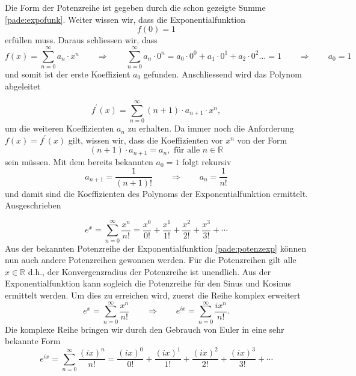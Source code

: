 Die Form der Potenzreihe ist gegeben durch die schon gezeigte Summe \ref{pade:expofunk}.
Weiter wissen wir, dass die Exponentialfunktion 
\begin{equation*}
f(0) = 1
\end{equation*}
erfüllen muss.
Daraus schliessen wir, dass
\begin{equation*}
f(x)=\sum_{n=0}^{\infty} a_{n} \cdot x^{n}
\qquad\Rightarrow\qquad
\sum_{n=0}^{\infty} a_{n} \cdot 0^{n} 
=
a_{0} \cdot 0^{0} + a_{1} \cdot 0^{1} + a_{2} \cdot 0^{2} \dots = 1
\qquad\Rightarrow\qquad
a_{0} = 1
\end{equation*}
und somit ist der erste Koeffizient $a_0$ gefunden.
Anschliessend wird das Polynom abgeleitet

\begin{equation*}
f^{\prime}(x)
=
\sum_{n=0}^{\infty}(n+1) \cdot a_{n+1} \cdot x^{n},
\end{equation*}
um die weiteren Koeffizienten $a_n$ zu erhalten.
Da immer noch die Anforderung $f(x) = f^{\prime}(x)$ gilt, wissen wir, dass die Koeffizienten vor $x^n$  von der Form
\begin{equation*}
(n+1) \cdot a_{n+1} 
= 
a_{n} , \text{ für alle } n \in \mathbb{R}
\end{equation*}
sein müssen. 
Mit dem bereits bekannten $a_0 = 1$ folgt rekursiv
\begin{equation*}
a_{n+1} 
= 
\frac{1}{(n+1)!}
\qquad\Rightarrow\qquad
a_{n} 
= 
\frac{1}{n!}
\end{equation*}
und damit sind die Koeffizienten des Polynoms der Exponentialfunktion ermittelt.
Ausgeschrieben 


\begin{equation}
e^{x}
=
\sum_{n=0}^{\infty} \frac{x^{n}}{n !}
=
\frac{x^{0}}{0 !}+\frac{x^{1}}{1 !}+\frac{x^{2}}{2 !}+\frac{x^{3}}{3 !}+\cdots 
\label{pade:potenzexp}
\end{equation}
Aus der bekannten Potenzreihe der Exponentialfunktion \ref{pade:potenzexp} können nun auch andere Potenzreihen gewonnen werden.
Für die Potenzreihen gilt alle $x \in \mathbb{R}$ d.h., der Konvergenzradius der Potenzreihe ist unendlich. 
Aus der Exponentialfunktion kann sogleich die Potenzreihe für den Sinus und Kosinus ermittelt werden.
Um dies zu erreichen wird, zuerst die Reihe komplex erweitert
\begin{equation*}
e^{x}
=
\sum_{n=0}^{\infty} \frac{x^{n}}{n !}
\qquad\Rightarrow\qquad
e^{ix}
=
\sum_{n=0}^{\infty} \frac{ix^{n}}{n !}.
\end{equation*}
Die komplexe Reihe bringen wir durch den Gebrauch von Euler in eine sehr bekannte Form  
\begin{equation}
e^{ix}
=
\sum_{n=0}^{\infty} \frac{(ix)^{n}}{n !}
=
\frac{(ix)^{0}}{0 !}+\frac{(ix)^{1}}{1 !}+\frac{(ix)^{2}}{2 !}+\frac{(ix)^{3}}{3 !}+\cdots
\end{equation}

